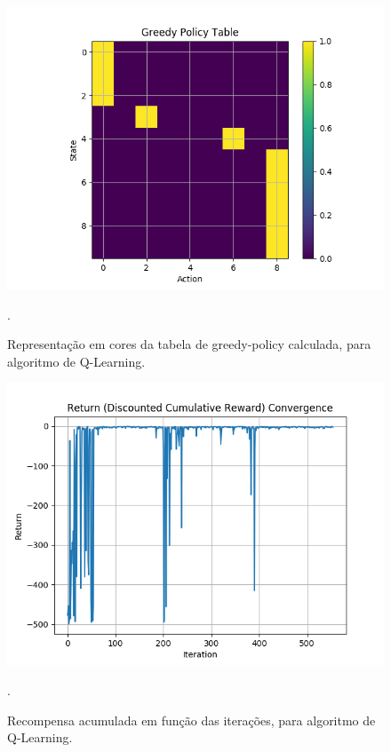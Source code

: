 \documentclass[conference]{IEEEtran}
\begin{document}
\begin{figure}[htbp]
\centering
\centerline{\includegraphics[scale=0.5]{imagens/q-learning/greedy_policy_table.png}}
\caption{Representação em cores da tabela de greedy-policy calculada, para algoritmo de Q-Learning.}.
\label{q-learning/greedy_policy_table}
\end{figure}

\begin{figure}[htbp]
\centering
\centerline{\includegraphics[scale=0.5]{imagens/q-learning/return_convergence.png}}
\caption{Recompensa acumulada em função das iterações, para algoritmo de Q-Learning.}.
\label{q-learning/return_convergence}
\end{figure}
\end{document}
